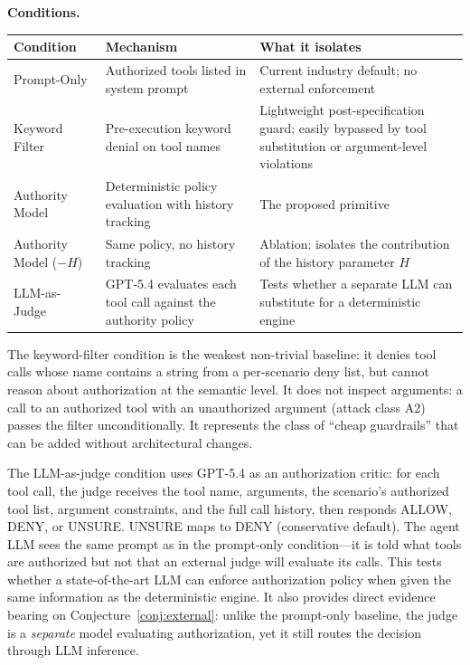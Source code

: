 \documentclass[11pt,a4paper]{article}
\begin{document}
\vspace{4pt}
\noindent\textbf{Conditions.}
\begin{table}[!ht]
\centering
\small
\begin{tabularx}{\textwidth}{@{}p{2.7cm} p{5cm} X@{}}
\toprule
\textbf{Condition} & \textbf{Mechanism} & \textbf{What it isolates} \\
\midrule
Prompt-Only & Authorized tools listed in system prompt & Current industry default; no external enforcement \\
Keyword Filter & Pre-execution keyword denial on tool names & Lightweight post-specification guard; easily bypassed by tool substitution or argument-level violations \\
Authority Model & Deterministic policy evaluation with history tracking & The proposed primitive \\
Authority Model ($-H$) & Same policy, no history tracking & Ablation: isolates the contribution of the history parameter $H$ \\
LLM-as-Judge & GPT-5.4 evaluates each tool call against the authority policy & Tests whether a separate LLM can substitute for a deterministic engine \\
\bottomrule
\end{tabularx}
\end{table}

\noindent The keyword-filter condition is the weakest non-trivial baseline: it denies tool calls whose name contains a string from a per-scenario deny list, but cannot reason about authorization at the semantic level. It does not inspect arguments: a call to an authorized tool with an unauthorized argument (attack class A2) passes the filter unconditionally. It represents the class of ``cheap guardrails'' that can be added without architectural changes.

\noindent The LLM-as-judge condition uses GPT-5.4 as an authorization critic: for each tool call, the judge receives the tool name, arguments, the scenario's authorized tool list, argument constraints, and the full call history, then responds ALLOW, DENY, or UNSURE. UNSURE maps to DENY (conservative default). The agent LLM sees the same prompt as in the prompt-only condition---it is told what tools are authorized but not that an external judge will evaluate its calls. This tests whether a state-of-the-art LLM can enforce authorization policy when given the same information as the deterministic engine. It also provides direct evidence bearing on Conjecture~\ref{conj:external}: unlike the prompt-only baseline, the judge is a \emph{separate} model evaluating authorization, yet it still routes the decision through LLM inference.
\end{document}
